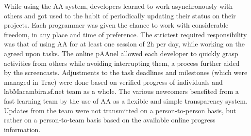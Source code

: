 \documentclass{article}
\begin{document}
While using the AA system, developers learned to work asynchronously with others
and got used to the habit of periodically updating their status on their
projects. Each programmer was given the chance to work with considerable
freedom, in any place and time of preference. The strictest required
responsibility was that of using AA for at least one session of 2h per day,
while working on the agreed upon tasks.  The online pAAnel allowed each
developer to quickly grasp activities from others while avoiding interrupting them, a
process further aided by the screencasts. Adjustments to the task deadlines and
milestones (which were managed in Trac) were done based on verified progress of
individuals and labMacambira.sf.net team as a whole. The various newcomers
benefited from a fast learning team by the use of AA as a flexible and simple
transparency system. Updates from the team were not transmitted on a
person-to-person basis, but rather on a person-to-team basis based on the
available online progress information.
\end{document}
